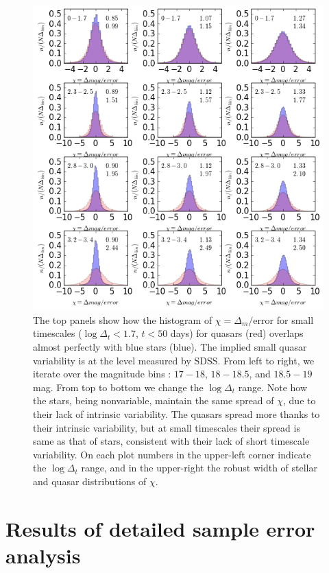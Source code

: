 \documentclass[a4paper,fleqn,usenatbib]{mnras}
\begin{document}
\begin{figure}
\label{fig:SF_panel}
\includegraphics[width=1.1\columnwidth]{Fig_3_histogram_panels.png}
 \caption{The top panels show how the histogram of  $\chi = \Delta_{m}/ \mathrm{error}$ for small 
timescales ($\log{\Delta_{t}} < 1.7$, $t<50$ days) for  quasars (red) overlaps almost perfectly with blue stars (blue). The  implied small quasar variability is at the level  measured by SDSS.  From left to right, we iterate over the  magnitude bins :  $17-18$,  $18-18.5$, and $18.5-19$ mag. From top to bottom we change the  $\log{\Delta_{t}}$  range. Note how  the  stars, being nonvariable, maintain the same spread of $\chi$, due to their lack of intrinsic variability. The quasars spread more thanks to their intrinsic variability, but at small timescales their spread is same as that of stars, consistent with their lack of short timescale variability. On each plot numbers in the upper-left corner indicate the $\log{\Delta_{t}}$ range, and in the upper-right the robust width of stellar and quasar distributions of $\chi$. }
\end{figure}

\section{Results of detailed sample error analysis}
\label{sec:err_analysis}
\end{document}
